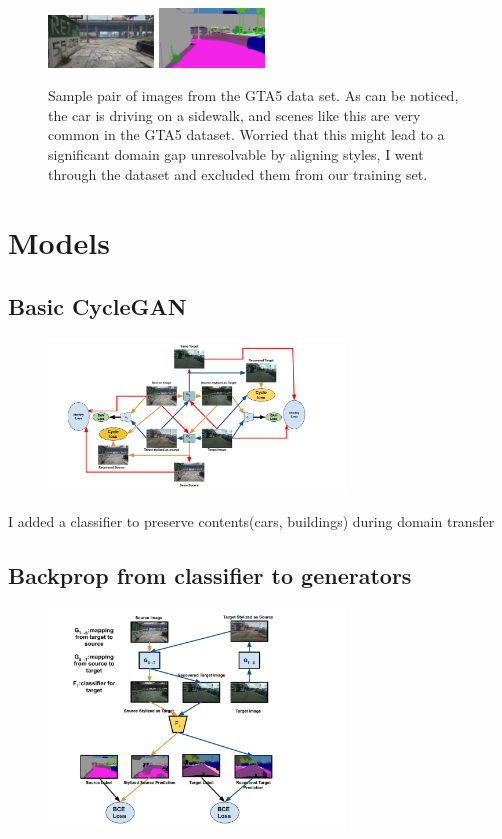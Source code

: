 \documentclass{article}
\begin{document}
\begin{figure}[H]
    \centering
    \includegraphics[width=0.25\textwidth]{figures/068_02196.jpg}
    \includegraphics[width=0.25\textwidth]{figures/068_02196.png}
    \caption{Sample pair of images from the GTA5 data set. As can be noticed, the car is driving on a sidewalk, and scenes like this are very common in the GTA5 dataset. Worried that this might lead to a significant domain gap unresolvable by aligning styles, I went through the dataset and excluded them from our training set.}
    \label{fig:GTA5}
\end{figure}

\section{Models}
\subsection{Basic CycleGAN\cite{zhu2017unpaired}}
\begin{figure}[H]
    \centering
\includegraphics[width=0.7\textwidth]{figures/cygan.pdf}
\end{figure}
I added a classifier to preserve contents(cars, buildings) during domain transfer
\subsection{Backprop from classifier to generators}
\begin{figure}[H]
    \centering
\includegraphics[width=0.7\textwidth]{figures/f_g.pdf}
\end{figure}
\end{document}
